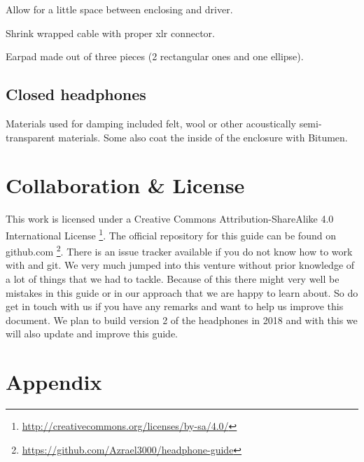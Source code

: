 \documentclass{article}
\begin{document}
Allow for a little space between enclosing and driver.

Shrink wrapped cable with proper xlr connector.

Earpad made out of three pieces (2 rectangular ones and one ellipse).

\subsection{Closed headphones}
\label{s:future:closed}

Materials used for damping included felt, wool or other acoustically semi-transparent materials. Some also coat the inside of the enclosure with Bitumen.

\section{Collaboration \& License}
This work is licensed under a Creative Commons Attribution-ShareAlike 4.0 International License \footnote{\url{http://creativecommons.org/licenses/by-sa/4.0/}}. The official repository for this guide can be found on github.com \footnote{\url{https://github.com/Azrael3000/headphone-guide}}. There is an issue tracker available if you do not know how to work with \latex and git. We very much jumped into this venture without prior knowledge of a lot of things that we had to tackle. Because of this there might very well be mistakes in this guide or in our approach that we are happy to learn about. So do get in touch with us if you have any remarks and want to help us improve this document. We plan to build version 2 of the headphones in 2018 and with this we will also update and improve this guide.

\section{Appendix}
\label{s:app}
\end{document}
